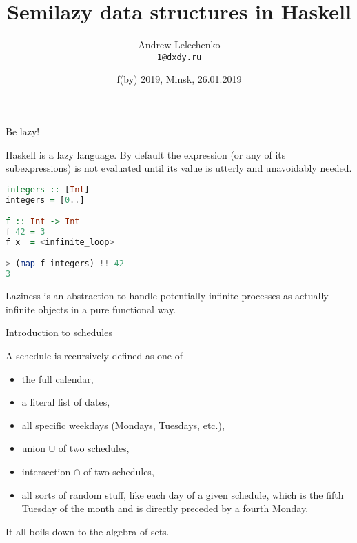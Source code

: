 \documentclass[handout]{beamer}
\title{Semilazy data structures in Haskell}
\author[Andrew Lelechenko]{Andrew Lelechenko \\ \texttt{1@dxdy.ru}}
\institute[Barclays]{Barclays, London}
\date{f(by) 2019, Minsk, 26.01.2019}
\begin{document}
\begin{frame}
	\titlepage
\end{frame}

\begin{frame}[fragile]{Be lazy!}

Haskell is a lazy language.
By default the expression (or any of its subexpressions)
is not evaluated until its value
is utterly and unavoidably needed.

\begin{lstlisting}[language=Haskell]
integers :: [Int]
integers = [0..]

f :: Int -> Int
f 42 = 3
f x  = <infinite_loop>

> (map f integers) !! 42
3
\end{lstlisting}

\pause

Laziness is an abstraction to handle potentially infinite processes
as actually infinite objects in a pure functional way.

\end{frame}

\begin{frame}{Introduction to schedules}

A schedule is recursively defined as one of
\begin{itemize}
\item the full calendar,
\pause
\item a literal list of dates,
\pause
\item all specific weekdays (Mondays, Tuesdays, etc.),
\pause
\item union $\cup$ of two schedules,
\pause
\item intersection $\cap$ of two schedules,
\pause
\item all sorts of random stuff,
like each day of a given schedule,
which is the fifth Tuesday of the month
and is directly preceded by a fourth Monday.
\end{itemize}

\bigskip

\pause
It all boils down to the algebra of sets.

\end{frame}
\end{document}
